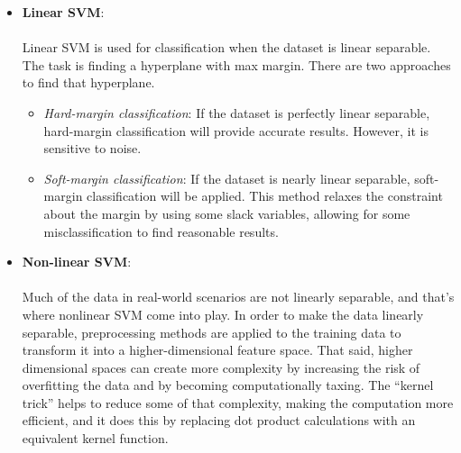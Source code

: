 \documentclass[a4paper]{report}
\begin{document}
	\begin{itemize}
		\item \textbf{Linear SVM}:
		\paragraph{}
		Linear SVM is used for classification when the dataset is linear separable. The task is finding a hyperplane with max margin. There are two approaches to find that hyperplane.
		
		\begin{itemize}
			\item \textit{Hard-margin classification}: If the dataset is perfectly linear separable, hard-margin classification will provide accurate results. However, it is sensitive to noise.
			\item \textit{Soft-margin classification}: If the dataset is nearly linear separable, soft-margin classification will be applied. This method relaxes the constraint about the margin by using some slack variables, allowing for some misclassification to find reasonable results.
		\end{itemize}
		
		\item \textbf{Non-linear SVM}:
		\paragraph{}
		Much of the data in real-world scenarios are not linearly separable, and that’s where nonlinear SVM come into play. In order to make the data linearly separable, preprocessing methods are applied to the training data to transform it into a higher-dimensional feature space. That said, higher dimensional spaces can create more complexity by increasing the risk of overfitting the data and by becoming computationally taxing. The “kernel trick” helps to reduce some of that complexity, making the computation more efficient, and it does this by replacing dot product calculations with an equivalent kernel function.
		

\end{itemize}
\end{document}

